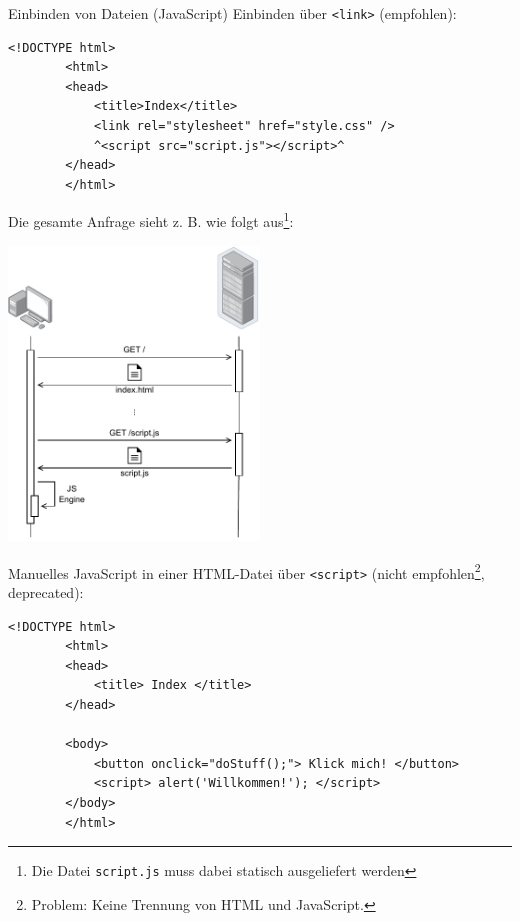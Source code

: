 \begin{example}{Einbinden von Dateien (JavaScript)}
    Einbinden über \texttt{<link>} (empfohlen):
    \begin{lstlisting}[language=HTML5]
        <!DOCTYPE html>
        <html>
        <head>
            <title>Index</title>
            <link rel="stylesheet" href="style.css" />
            ^<script src="script.js"></script>^
        </head>
        </html>
    \end{lstlisting}

    Die gesamte Anfrage sieht z. B. wie folgt aus\footnote{Die Datei \texttt{script.js} muss dabei statisch ausgeliefert werden}:

    \begin{center}
        \includegraphics[width=0.50\textwidth]{includes/figures/defi_client_js.pdf}
    \end{center}

    Manuelles JavaScript in einer HTML-Datei über \texttt{<script>} (nicht empfohlen\footnote{Problem: Keine Trennung von HTML und JavaScript.}, deprecated):
    \begin{lstlisting}[language=HTML5]
        <!DOCTYPE html>
        <html>
        <head>
            <title> Index </title>
        </head>

        <body>
            <button onclick="doStuff();"> Klick mich! </button>
            <script> alert('Willkommen!'); </script>
        </body>
        </html>
    \end{lstlisting}
\end{example}

